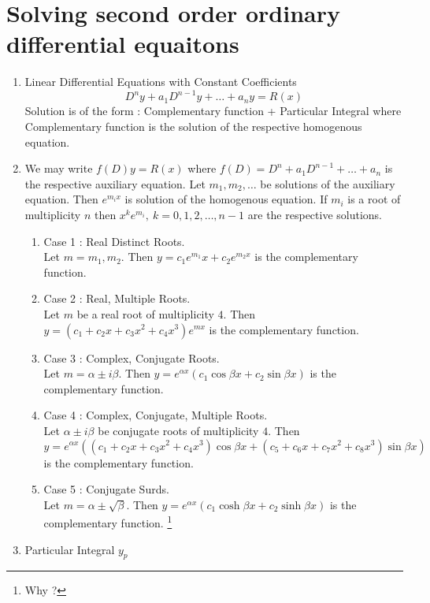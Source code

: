 \section{Solving second order ordinary differential equaitons}
\begin{enumerate}
	\item Linear Differential Equations with Constant Coefficients
	\begin{equation} D^n y + a_1 D^{n-1} y + \dots + a_n y = R(x) \end{equation}
		Solution is of the form : Complementary function + Particular Integral where Complementary function is the solution of the respective homogenous equation.
	\item We may write $f(D)y = R(x)$ where $f(D) = D^n + a_1 D^{n-1} + \dots + a_n$ is the respective auxiliary equation.
		Let $m_1,m_2,\dots$ be solutions of the auxiliary equation. 
		Then $e^{m_i x}$ is solution of the homogenous equation. 
		If $m_i$ is a root of multiplicity $n$ then $x^ke^{m_i},\ k = 0,1,2,\dots, n-1$ are the respective solutions.
	\begin{enumerate}
		\item Case 1 : Real Distinct Roots.\\
			Let $m = m_1, m_2$. Then $y = c_1 e^{m_1}x + c_2 e^{m_2 x}$ is the complementary function.
		\item Case 2 : Real, Multiple Roots.\\
			Let $m$ be a real root of multiplicity $4$. Then $y = (c_1+c_2x+c_3x^2+c_4x^3) e^{m x}$ is the complementary function.
		\item Case 3 : Complex, Conjugate Roots.\\
			Let $m = \alpha \pm i \beta$. Then $y = e^{\alpha x} (c_1 \cos \beta x + c_2 \sin \beta x)$ is the complementary function.
		\item Case 4 : Complex, Conjugate, Multiple Roots.\\
			Let $\alpha \pm i \beta$ be conjugate roots of multiplicity $4$. Then $y = e^{\alpha x} ((c_1 + c_2 x + c_3 x^2 + c_4 x^3) \cos \beta x + (c_5 + c_6 x + c_7 x^2 + c_8 x^3) \sin \beta x)$ is the complementary function.
		\item {\color{red} Case 5 : Conjugate Surds.\\
			Let $m = \alpha \pm \sqrt{\beta}$. Then $y = e^{\alpha x}(c_1 \cosh \beta x + c_2 \sinh \beta x)$ is the complementary function. }\footnote{Why ?}
	\end{enumerate}
	\item Particular Integral $y_p$

\end{enumerate}
